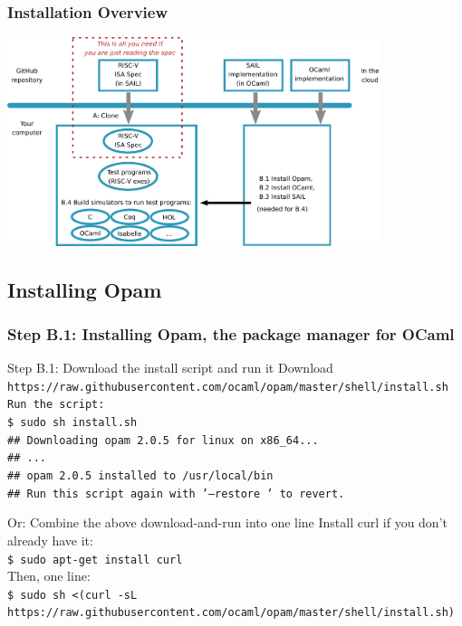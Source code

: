 \documentclass[aspectratio=169]{beamer}
\newcommand{\hm}{\hspace*{1em}}
\newcommand{\scripttt}{\scriptsize\tt}
\begin{document}
\begin{frame}
  \frametitle{Installation Overview}

  \centering
  \includegraphics[height=2.4in]{Figures/Fig_Installation_Overview.png}
\end{frame}



\subsection{Installing Opam}

\begin{frame}
  \frametitle{Step B.1: Installing Opam, the package manager for OCaml}

  \begin{block}{Step B.1: Download the install script and run it}
    {\scriptsize Download {\tt https://raw.githubusercontent.com/ocaml/opam/master/shell/install.sh}}
    {\scripttt Run the script: \\
      \hm{}\$ sudo sh install.sh \\
      \hm{}\#\# Downloading opam 2.0.5 for linux on x86\_64... \\
      \hm{}\#\# ... \\
      \hm{}\#\# opam 2.0.5 installed to /usr/local/bin \\
      \hm{}\#\# Run this script again with '--restore ' to revert.}
  \end{block}

  \begin{block}{Or: Combine the above download-and-run into one line}
    {\scriptsize Install curl if you don't already have it:} \\
    {\scripttt\hm{}\$ sudo apt-get install curl} \\
    {\scriptsize Then, one line:} \\
    {\scripttt\hm{}\$ sudo sh <(curl -sL https://raw.githubusercontent.com/ocaml/opam/master/shell/install.sh)}
  \end{block}
\end{frame}
\end{document}
